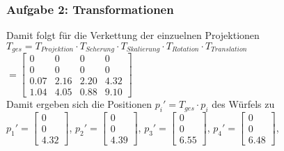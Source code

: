 \documentclass[accentcolor=tud9c,colorbacktitle,inverttitle,landscape,german,presentation,t]{tudbeamer}
\begin{document}
	\begin{frame}
		\frametitle{Aufgabe 2: Transformationen}
		Damit folgt für die Verkettung der einzuelnen Projektionen\\
		$T_{ges}=T_{Projektion} \cdot T_{Scherung} \cdot T_{Skalierung} \cdot T_{Rotation} \cdot T_{Translation}$\\
		$=\begin{bmatrix}
		0 &  0 &  0 &  0\\
		0 &  0 & 0 &  0\\
		0.07 &  2.16 &  2.20 &  4.32\\
		1.04 &  4.05 &   0.88 &  9.10
		\end{bmatrix}$\\
		Damit ergeben sich die Positionen $p_i'=T_{ges} \cdot p_i $ des Würfels zu\\
		{\small 
			$p_1'=\begin{bmatrix}  0\\0\\ 4.32 \end{bmatrix}$, %
			$p_2'=\begin{bmatrix}  0\\0\\4.39 \end{bmatrix}$, %
			$p_3'=\begin{bmatrix}  0\\0\\6.55 \end{bmatrix}$, %
			$p_4'=\begin{bmatrix}  0\\0\\6.48 \end{bmatrix}$,\\ %
}
\end{frame}
\end{document}
